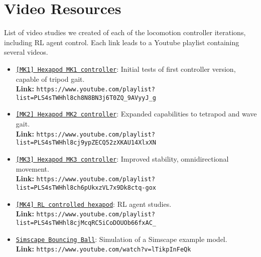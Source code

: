 \chapter*{Video Resources}

List of video studies we created of each of the locomotion controller iterations, including RL agent control.
Each link leads to a Youtube playlist containing several videos.

\begin{itemize} 
	\item \href{https://www.youtube.com/playlist?list=PLS4sTWHhl8ch8N8BN3j6T0ZQ_9AVyyJ_g}{\texttt{[MK1] Hexapod MK1 controller}}: Initial tests of first controller version, capable of tripod gait. \\
																						  \textbf{Link:} \nolinkurl{https://www.youtube.com/playlist?list=PLS4sTWHhl8ch8N8BN3j6T0ZQ_9AVyyJ_g} \label{vid: MK1}
	
	\item \href{https://www.youtube.com/playlist?list=PLS4sTWHhl8cj9ypZECQ52zXKAU14XlxXN}{\texttt{[MK2] Hexapod MK2 controller}}: Expanded capabilities to tetrapod and wave gait. \\
																						  \textbf{Link:} \nolinkurl{https://www.youtube.com/playlist?list=PLS4sTWHhl8cj9ypZECQ52zXKAU14XlxXN} \label{vid: MK2}
	
	\item \href{https://www.youtube.com/playlist?list=PLS4sTWHhl8ch6pUkxzVL7x9Dk8ctq-gox}{\texttt{[MK3] Hexapod MK3 controller}}: Improved stability, omnidirectional movement. \\
																						  \textbf{Link:} \nolinkurl{https://www.youtube.com/playlist?list=PLS4sTWHhl8ch6pUkxzVL7x9Dk8ctq-gox} \label{vid: MK3}
	
	\item \href{https://www.youtube.com/playlist?list=PLS4sTWHhl8cjMcqRC5iCoDOUOb66fxAC_}{\texttt{[MK4] RL controlled hexapod}}: RL agent studies. \\
	\textbf{Link:} \nolinkurl{https://www.youtube.com/playlist?list=PLS4sTWHhl8cjMcqRC5iCoDOUOb66fxAC_} \label{vid: MK4}
	
	
	\item \href{https://www.youtube.com/watch?v=lTikpInFeQk}{\texttt{Simscape Bouncing Ball}}: Simulation of a Simscape example model. \\
															 \textbf{Link:} \nolinkurl{https://www.youtube.com/watch?v=lTikpInFeQk} \label{vid: Simscape}
\end{itemize}